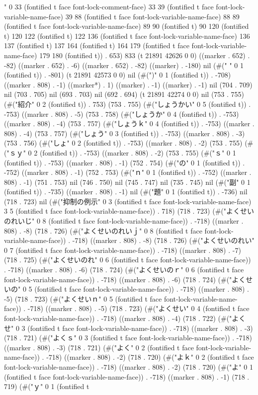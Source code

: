 " 0 33 (fontified t face font-lock-comment-face) 33 39 (fontified t face font-lock-variable-name-face) 39 88 (fontified t face font-lock-variable-name-face) 88 89 (fontified t face font-lock-variable-name-face) 89 90 (fontified t) 90 120 (fontified t) 120 122 (fontified t) 122 136 (fontified t face font-lock-variable-name-face) 136 137 (fontified t) 137 164 (fontified t) 164 179 (fontified t face font-lock-variable-name-face) 179 180 (fontified t)) . 653) 833 (t 21891 42626 0 0) ((marker . 652) . -82) ((marker . 652) . -6) ((marker . 652) . -82) ((marker) . -180) nil (#(" " 0 1 (fontified t)) . -801) (t 21891 42573 0 0) nil (#(")" 0 1 (fontified t)) . -708) ((marker . 808) . -1) ((marker*) . 1) ((marker) . -1) ((marker) . -1) nil (704 . 709) nil (703 . 705) nil (693 . 703) nil (692 . 694) (t 21891 42274 0 0) nil (753 . 755) (#("紹介" 0 2 (fontified t)) . 753) (753 . 755) (#("しょうかい" 0 5 (fontified t)) . -753) ((marker . 808) . -5) (753 . 758) (#("しょうか" 0 4 (fontified t)) . -753) ((marker . 808) . -4) (753 . 757) (#("しょうｋ" 0 4 (fontified t)) . -753) ((marker . 808) . -4) (753 . 757) (#("しょう" 0 3 (fontified t)) . -753) ((marker . 808) . -3) (753 . 756) (#("しょ" 0 2 (fontified t)) . -753) ((marker . 808) . -2) (753 . 755) (#("ｓｙ" 0 2 (fontified t)) . -753) ((marker . 808) . -2) (753 . 755) (#("ｓ" 0 1 (fontified t)) . -753) ((marker . 808) . -1) (752 . 754) (#("の" 0 1 (fontified t)) . -752) ((marker . 808) . -1) (752 . 753) (#("ｎ" 0 1 (fontified t)) . -752) ((marker . 808) . -1) (751 . 753) nil (746 . 750) nil (745 . 747) nil (735 . 745) nil (#("副" 0 1 (fontified t)) . -735) ((marker . 808) . -1) nil (#("題" 0 1 (fontified t)) . -736) nil (718 . 723) nil (#("抑制の例示" 0 3 (fontified t face font-lock-variable-name-face) 3 5 (fontified t face font-lock-variable-name-face)) . 718) (718 . 723) (#("よくせいのれいじ" 0 8 (fontified t face font-lock-variable-name-face)) . -718) ((marker . 808) . -8) (718 . 726) (#("よくせいのれいｊ" 0 8 (fontified t face font-lock-variable-name-face)) . -718) ((marker . 808) . -8) (718 . 726) (#("よくせいのれい" 0 7 (fontified t face font-lock-variable-name-face)) . -718) ((marker . 808) . -7) (718 . 725) (#("よくせいのれ" 0 6 (fontified t face font-lock-variable-name-face)) . -718) ((marker . 808) . -6) (718 . 724) (#("よくせいのｒ" 0 6 (fontified t face font-lock-variable-name-face)) . -718) ((marker . 808) . -6) (718 . 724) (#("よくせいの" 0 5 (fontified t face font-lock-variable-name-face)) . -718) ((marker . 808) . -5) (718 . 723) (#("よくせいｎ" 0 5 (fontified t face font-lock-variable-name-face)) . -718) ((marker . 808) . -5) (718 . 723) (#("よくせい" 0 4 (fontified t face font-lock-variable-name-face)) . -718) ((marker . 808) . -4) (718 . 722) (#("よくせ" 0 3 (fontified t face font-lock-variable-name-face)) . -718) ((marker . 808) . -3) (718 . 721) (#("よくｓ" 0 3 (fontified t face font-lock-variable-name-face)) . -718) ((marker . 808) . -3) (718 . 721) (#("よく" 0 2 (fontified t face font-lock-variable-name-face)) . -718) ((marker . 808) . -2) (718 . 720) (#("よｋ" 0 2 (fontified t face font-lock-variable-name-face)) . -718) ((marker . 808) . -2) (718 . 720) (#("よ" 0 1 (fontified t face font-lock-variable-name-face)) . -718) ((marker . 808) . -1) (718 . 719) (#("ｙ" 0 1 (fontified t 